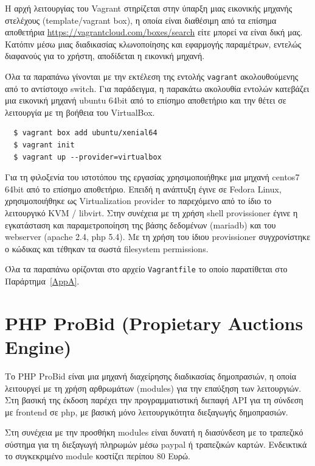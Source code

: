 \documentclass[12pt]{report}
\begin{document}
Η αρχή λειτουργίας του \textlatin{Vagrant} στηρίζεται στην ύπαρξη μιας εικονικής μηχανής στελέχους (\textlatin{template/vagrant box}), η οποία είναι διαθέσιμη από τα επίσημα αποθετήρια \textlatin{\url{https://vagrantcloud.com/boxes/search}} είτε μπορεί να είναι δική μας. Κατόπιν μέσω μιας διαδικασίας κλωνοποίησης και εφαρμογής παραμέτρων, εντελώς διαφανούς για το χρήστη, αποδίδεται η εικονική μηχανή.

Όλα τα παραπάνω γίνονται με την εκτέλεση της εντολής \textlatin{\texttt{vagrant}} ακολουθούμενης από το αντίστοιχο \textlatin{switch}. Για παράδειγμα, η παρακάτω ακολουθία εντολών κατεβάζει μια εικονική μηχανή \textlatin{ubuntu 64bit} από το επίσημο αποθετήριο και την θέτει σε λειτουργία με τη βοήθεια του \textlatin{VirtualBox}.
\begin{Verbatim}
  $ vagrant box add ubuntu/xenial64
  $ vagrant init
  $ vagrant up --provider=virtualbox
\end{Verbatim}
Για τη φιλοξενία του ιστοτόπου της εργασίας χρησιμοποιήθηκε μια μηχανή \textlatin{centos7 64bit} από το επίσημο αποθετήριο. Επειδή η ανάπτυξη έγινε σε \textlatin{Fedora Linux}, χρησιμοποιήθηκε ως \textlatin{Virtualization provider} το παρεχόμενο από το ίδιο το λειτουργικό \textlatin{KVM / libvirt}. Στην συνέχεια με τη χρήση \textlatin{shell provissioner} έγινε η εγκατάσταση και παραμετροποίηση της βάσης δεδομένων (\textlatin{mariadb}) και του \textlatin{webserver (apache 2.4, php 5.4)}. Με τη χρήση του ίδιου \textlatin{provissioner} συγχρονίστηκε ο κώδικας και τέθηκαν τα σωστά \textlatin{filesystem permissions}.

Όλα τα παραπάνω ορίζονται στο αρχείο \textlatin{\texttt{Vagrantfile}} το οποίο παρατίθεται στο Παράρτημα~\ref{AppA}.

\section{\textlatin{PHP ProBid (Propietary Auctions Engine)}}\label{phpprobid}
Το \textlatin{PHP ProBid} είναι μια μηχανή διαχείρησης διαδικασίας δημοπρασιών, η οποία λειτουργεί με τη χρήση αρθρωμάτων (\textlatin{modules}) για την επαύξηση των λειτουργιών. Στη βασική της έκδοση παρέχει την προγραμματιστική διεπαφή \textlatin{API} για τη σύνδεση με \textlatin{frontend} σε \textlatin{php}, με βασική μόνο λειτουργικότητα διεξαγωγής δημοπρασιών.

Στη συνέχεια με την προσθήκη \textlatin{modules} είναι δυνατή η διασύνδεση με το τραπεζικό σύστημα για τη διεξαγωγή πληρωμών μέσω \textlatin{paypal} ή τραπεζικών καρτών. Ενδεικτικά το συγκεκριμένο \textlatin{module} κοστίζει περίπου 80 Ευρώ.
\end{document}
